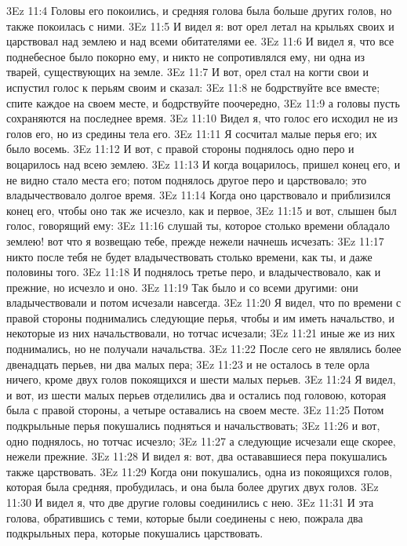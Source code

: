 \vs 3Ez 11:4 Головы его покоились, и средняя голова была больше других голов, но также покоилась с ними.
\vs 3Ez 11:5 И видел я: вот орел летал на крыльях своих и царствовал над землею и над всеми обитателями ее.
\vs 3Ez 11:6 И видел я, что все поднебесное было покорно ему, и никто не сопротивлялся ему, ни одна из тварей, существующих на земле.
\vs 3Ez 11:7 И вот, орел стал на когти свои и испустил голос к перьям своим и сказал:
\vs 3Ez 11:8 не бодрствуйте все вместе; спите каждое на своем месте, и бодрствуйте поочередно,
\vs 3Ez 11:9 а головы пусть сохраняются на последнее время.
\vs 3Ez 11:10 Видел я, что голос его исходил не из голов его, но из средины тела его.
\vs 3Ez 11:11 Я сосчитал малые перья его; их было восемь.
\vs 3Ez 11:12 И вот, с правой стороны поднялось одно перо и воцарилось над всею землею.
\vs 3Ez 11:13 И когда воцарилось, пришел конец его, и не видно стало места его; потом поднялось другое перо и царствовало; это владычествовало долгое время.
\vs 3Ez 11:14 Когда оно царствовало и приблизился конец его, чтобы оно так же исчезло, как и первое,
\vs 3Ez 11:15 и вот, слышен был голос, говорящий ему:
\vs 3Ez 11:16 слушай ты, которое столько времени обладало землею! вот что я возвещаю тебе, прежде нежели начнешь исчезать:
\vs 3Ez 11:17 никто после тебя не будет владычествовать столько времени, как ты, и даже половины того.
\vs 3Ez 11:18 И поднялось третье перо, и владычествовало, как и прежние, но исчезло и оно.
\vs 3Ez 11:19 Так было и со всеми другими: они владычествовали и потом исчезали навсегда.
\vs 3Ez 11:20 Я видел, что по времени с правой стороны поднимались следующие перья, чтобы и им иметь начальство, и некоторые из них начальствовали, но тотчас исчезали;
\vs 3Ez 11:21 иные же из них поднимались, но не получали начальства.
\vs 3Ez 11:22 После сего не являлись более двенадцать перьев, ни два малых пера;
\vs 3Ez 11:23 и не осталось в теле орла ничего, кроме двух голов покоящихся и шести малых перьев.
\vs 3Ez 11:24 Я видел, и вот, из шести малых перьев отделились два и остались под головою, которая была с правой стороны, а четыре оставались на своем месте.
\vs 3Ez 11:25 Потом подкрыльные перья покушались подняться и начальствовать;
\vs 3Ez 11:26 и вот, одно поднялось, но тотчас исчезло;
\vs 3Ez 11:27 а следующие исчезали еще скорее, нежели прежние.
\vs 3Ez 11:28 И видел я: вот, два остававшиеся пера покушались также царствовать.
\vs 3Ez 11:29 Когда они покушались, одна из покоящихся голов, которая была средняя, пробудилась, и она была более других двух голов.
\vs 3Ez 11:30 И видел я, что две другие головы соединились с нею.
\vs 3Ez 11:31 И эта голова, обратившись с теми, которые были соединены с нею, пожрала два подкрыльных пера, которые покушались царствовать.
